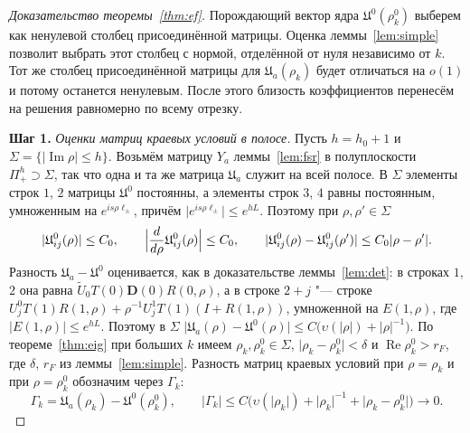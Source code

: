 \documentclass[12pt,a4paper]{article}
\numberwithin{equation}{section}
\theoremstyle{definition}
\newcommand{\step}[1]{\smallskip\noindent\textbf{Шаг #1.}}
\newcommand{\abs}[1]{\lvert#1\rvert}
\newcommand{\Imm}{\operatorname{Im}}
\newcommand{\Ree}{\operatorname{Re}}
\newcommand{\Uf}{\mathfrak U}
\newcommand{\Dd}{\mathbf D}
\begin{document}
\begin{proof}[Доказательство теоремы~\ref{thm:ef}]
Порождающий вектор ядра $\Uf^0(\rho_k^0)$ выберем как ненулевой столбец
присоединённой матрицы. Оценка леммы~\ref{lem:simple} позволит выбрать этот
столбец с нормой, отделённой от нуля независимо от $k$.
Тот же столбец присоединённой матрицы для $\Uf_a(\rho_k)$ будет отличаться
на $o(1)$ и потому останется ненулевым. После этого близость коэффициентов
перенесём на решения равномерно по всему отрезку.

\step{1} \textit{Оценки матриц краевых условий в полосе.} Пусть $h=h_0+1$ и
$\Sigma=\{\abs{\Imm\rho}\le h\}$. Возьмём матрицу $Y_a$
леммы~\ref{lem:fsr} в полуплоскости $\Pi^h_+\supset\Sigma$, так что одна и та же матрица
$\Uf_a$ служит на всей полосе. В $\Sigma$ элементы строк $1$, $2$ матрицы $\Uf^0$ постоянны, а
элементы строк $3$, $4$ равны постоянным, умноженным на $e^{is\rho\ell_\pm}$, причём
$\abs{e^{is\rho\ell_\pm}}\le e^{hL}$. Поэтому при $\rho,\rho'\in\Sigma$
\[
 \abs{\Uf^0_{ij}(\rho)}\le C_0,\qquad \Bigl\lvert\frac{d}{d\rho}\Uf^0_{ij}(\rho)\Bigr\rvert\le C_0,\qquad
 \abs{\Uf^0_{ij}(\rho)-\Uf^0_{ij}(\rho')}\le C_0\abs{\rho-\rho'}.
\]
Разность $\Uf_a-\Uf^0$ оценивается, как в доказательстве леммы~\ref{lem:det}: в строках $1$, $2$
она равна $\widetilde U_0T(0)\Dd(0)R(0,\rho)$, а в строке $2+j$ "--- строке
$U_j^0T(1)R(1,\rho)+\rho^{-1}U_j^1T(1)(I+R(1,\rho))$, умноженной на $E(1,\rho)$, где
$\abs{E(1,\rho)}\le e^{hL}$. Поэтому в $\Sigma$
$\abs{\Uf_a(\rho)-\Uf^0(\rho)}\le C\bigl(\upsilon(\abs\rho)+\abs\rho^{-1}\bigr)$. По
теореме~\ref{thm:eig} при больших $k$ имеем $\rho_k,\rho_k^0\in\Sigma$, $\abs{\rho_k-\rho_k^0}<\delta$
и $\Ree\rho_k^0>r_F$, где $\delta$, $r_F$ из леммы~\ref{lem:simple}. Разность матриц краевых
условий при $\rho=\rho_k$ и при $\rho=\rho_k^0$ обозначим через $\Gamma_k$:
\begin{equation}\label{eq:Ek}
 \Gamma_k=\Uf_a(\rho_k)-\Uf^0(\rho_k^0),\qquad
 \abs{\Gamma_k}\le C\bigl(\upsilon(\abs{\rho_k})+\abs{\rho_k}^{-1}+\abs{\rho_k-\rho_k^0}\bigr)\to0.
\end{equation}


\end{proof}
\end{document}
